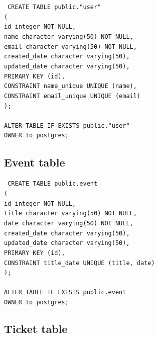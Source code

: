 \texttt{
    CREATE TABLE public."user" \\
    ( \\
    id integer NOT NULL, \\
    name character varying(50) NOT NULL, \\
    email character varying(50) NOT NULL, \\
    created\_date character varying(50), \\
    updated\_date character varying(50), \\
    PRIMARY KEY (id), \\
    CONSTRAINT name\_unique UNIQUE (name), \\
    CONSTRAINT email\_unique UNIQUE (email) \\
    ); \\
    \\
    ALTER TABLE IF EXISTS public."user" \\
    OWNER to postgres; \\
}

\subsection{Event table}\label{subsec:event-table}

\texttt{
    CREATE TABLE public.event \\
    ( \\
    id integer NOT NULL,\\
    title character varying(50) NOT NULL,\\
    date character varying(50) NOT NULL,\\
    created\_date character varying(50),\\
    updated\_date character varying(50),\\
    PRIMARY KEY (id),\\
    CONSTRAINT title\_date UNIQUE (title, date)\\
    );\\
    \\
    ALTER TABLE IF EXISTS public.event\\
    OWNER to postgres;\\
}

\subsection{Ticket table}\label{subsec:ticket-table}

